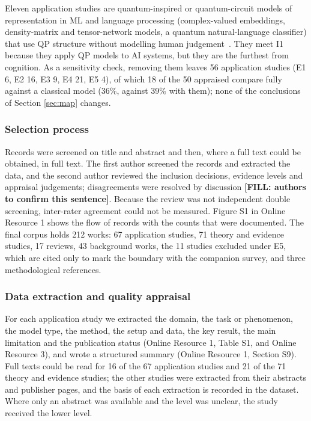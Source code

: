 \documentclass[pdflatex,sn-basic]{sn-jnl}
\newcommand{\fillin}[1]{{\color{red}\bfseries [FILL: #1]}}
\begin{document}
Eleven application studies are quantum-inspired or quantum-circuit models of representation in ML and language processing (complex-valued embeddings, density-matrix and tensor-network models, a quantum natural-language classifier) that use QP structure without modelling human judgement~\citep{Widdows2003,Sordoni2013,Stoudenmire2016,Zhang2018,Li2019,Li2021a,Li2021b,Svozil2025,Zhang2025,Nebli2026,Lorenz2023}. They meet I1 because they apply QP models to AI systems, but they are the furthest from cognition. As a sensitivity check, removing them leaves 56 application studies (E1 6, E2 16, E3 9, E4 21, E5 4), of which 18 of the 50 appraised compare fully against a classical model (36\%, against 39\% with them); none of the conclusions of Section \ref{sec:map} changes.

\subsubsection{Selection process}\label{sec:selection}
Records were screened on title and abstract and then, where a full text could be obtained, in full text. The first author screened the records and extracted the data, and the second author reviewed the inclusion decisions, evidence levels and appraisal judgements; disagreements were resolved by discussion \fillin{authors to confirm this sentence}. Because the review was not independent double screening, inter-rater agreement could not be measured. Figure S1 in Online Resource 1 shows the flow of records with the counts that were documented. The final corpus holds 212 works: 67 application studies, 71 theory and evidence studies, 17 reviews, 43 background works, the 11 studies excluded under E5, which are cited only to mark the boundary with the companion survey, and three methodological references.

\subsubsection{Data extraction and quality appraisal}\label{sec:extraction}
For each application study we extracted the domain, the task or phenomenon, the model type, the method, the setup and data, the key result, the main limitation and the publication status (Online Resource 1, Table S1, and Online Resource 3), and wrote a structured summary (Online Resource 1, Section S9). Full texts could be read for 16 of the 67 application studies and 21 of the 71 theory and evidence studies; the other studies were extracted from their abstracts and publisher pages, and the basis of each extraction is recorded in the dataset. Where only an abstract was available and the level was unclear, the study received the lower level.
\end{document}
